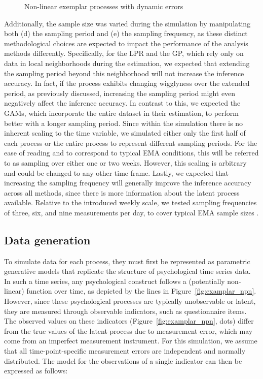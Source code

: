 \documentclass[man, floatsintext]{apa7}
\begin{document}
\begin{figure}[!t]
  \caption{Non-linear exemplar processes with dynamic errors}
  \label{fig:exemplar_pn}
\end{figure}

Additionally, the sample size was varied during the simulation by manipulating
both (d) the sampling period and (e) the sampling frequency, as these distinct
methodological choices are expected to impact the performance of the analysis
methods differently. Specifically, for the LPR and the GP, which rely only on
data in local neighborhoods during the estimation, we expected that extending
the sampling period beyond this neighborhood will not increase the inference
accuracy. In fact, if the process exhibits changing wigglyness over the
extended period, as previously discussed, increasing the sampling period might
even negatively affect the inference accuracy. In contrast to this, we expected
the GAMs, which incorporate the entire dataset in their estimation, to perform
better with a longer sampling period. Since within the simulation there is no
inherent scaling to the time variable, we simulated either only the first half
of each process or the entire process to represent different sampling periods.
For the ease of reading and to correspond to typical EMA conditions, this will
be referred to as sampling over either one or two weeks. However, this scaling
is arbitrary and could be changed to any other time frame. Lastly, we expected
that increasing the sampling frequency will generally improve the inference
accuracy across all methods, since there is more information about the latent
process available. Relative to the introduced weekly scale, we tested sampling
frequencies of three, six, and nine measurements per day, to cover typical EMA
sample sizes \parencite{wrzus_ecological_2023}.

\subsection{Data generation}

To simulate data for each process, they must first be represented as parametric
generative models that replicate the structure of psychological time series
data. In such a time series, any psychological construct follows a (potentially
non-linear) function over time, as depicted by the lines in
Figure~\ref{fig:examplar_npn}. However, since these psychological processes are
typically unobservable or latent, they are measured through observable
indicators, such as questionnaire items. The observed values on these
indicators (Figure~\ref{fig:examplar_npn}, dots) differ from the true values of
the latent process due to measurement error, which may come from an imperfect
measurement instrument. For this simulation, we assume that all
time-point-specific measurement errors are independent and normally
distributed. The model for the observations of a single indicator can then be
expressed as follows:
\end{document}
